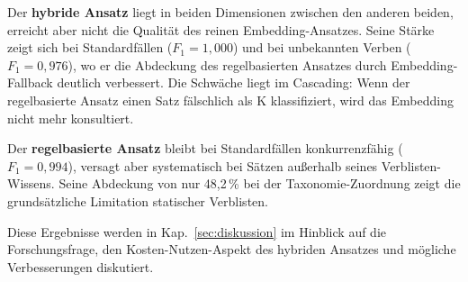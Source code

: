Der \textbf{hybride Ansatz} liegt in beiden Dimensionen zwischen den anderen beiden, erreicht aber nicht die Qualität des reinen Embedding-Ansatzes.
Seine Stärke zeigt sich bei Standardfällen ($F_1 = 1{,}000$) und bei unbekannten Verben ($F_1 = 0{,}976$), wo er die Abdeckung des regelbasierten Ansatzes durch Embedding-Fallback deutlich verbessert.
Die Schwäche liegt im Cascading: Wenn der regelbasierte Ansatz einen Satz fälschlich als K klassifiziert, wird das Embedding nicht mehr konsultiert.

Der \textbf{regelbasierte Ansatz} bleibt bei Standardfällen konkurrenzfähig ($F_1 = 0{,}994$), versagt aber systematisch bei Sätzen außerhalb seines Verblisten-Wissens.
Seine Abdeckung von nur 48{,}2\,\% bei der Taxonomie-Zuordnung zeigt die grundsätzliche Limitation statischer Verblisten.

Diese Ergebnisse werden in Kap.~\ref{sec:diskussion} im Hinblick auf die Forschungsfrage, den Kosten-Nutzen-Aspekt des hybriden Ansatzes und mögliche Verbesserungen diskutiert.
